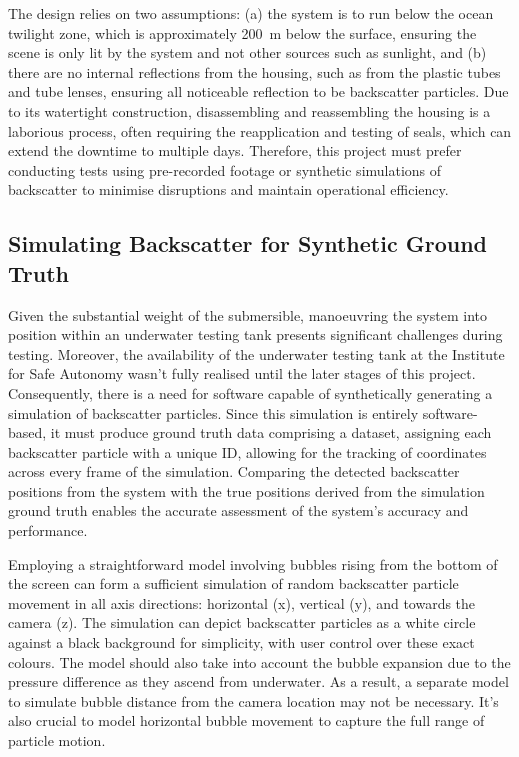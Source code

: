 The design relies on two assumptions: (a) the system is to run below the ocean twilight zone, which is approximately \SI{200}{\metre} below the surface, ensuring the scene is only lit by the system and not other sources such as sunlight, and (b) there are no internal reflections from the housing, such as from the plastic tubes and tube lenses, ensuring all noticeable reflection to be backscatter particles. Due to its watertight construction, disassembling and reassembling the housing is a laborious process, often requiring the reapplication and testing of seals, which can extend the downtime to multiple days. Therefore, this project must prefer conducting tests using pre-recorded footage or synthetic simulations of backscatter to minimise disruptions and maintain operational efficiency.

\subsection{Simulating Backscatter for Synthetic Ground Truth}
\label{designsim}

Given the substantial weight of the submersible, manoeuvring the system into position within an underwater testing tank presents significant challenges during testing. Moreover, the availability of the underwater testing tank at the Institute for Safe Autonomy wasn't fully realised until the later stages of this project. Consequently, there is a need for software capable of synthetically generating a simulation of backscatter particles. Since this simulation is entirely software-based, it must produce ground truth data comprising a dataset, assigning each backscatter particle with a unique ID, allowing for the tracking of coordinates across every frame of the simulation. Comparing the detected backscatter positions from the system with the true positions derived from the simulation ground truth enables the accurate assessment of the system's accuracy and performance.

Employing a straightforward model involving bubbles rising from the bottom of the screen can form a sufficient simulation of random backscatter particle movement in all axis directions: horizontal (x), vertical (y), and towards the camera (z). The simulation can depict backscatter particles as a white circle against a black background for simplicity, with user control over these exact colours. The model should also take into account the bubble expansion due to the pressure difference as they ascend from underwater. As a result, a separate model to simulate bubble distance from the camera location may not be necessary. It's also crucial to model horizontal bubble movement to capture the full range of particle motion.

